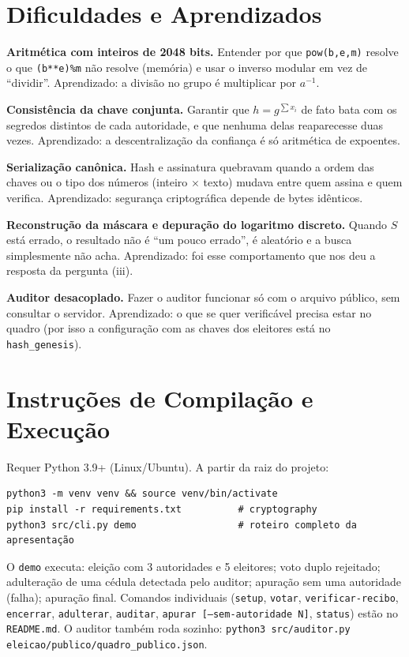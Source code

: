 \documentclass[11pt,a4paper]{article}
\begin{document}
\section{Dificuldades e Aprendizados}
\textbf{Aritmética com inteiros de 2048 bits.} Entender por que \texttt{pow(b,e,m)} resolve o que \texttt{(b**e)\%m} não resolve (memória) e usar o inverso modular em vez de ``dividir''. Aprendizado: a divisão no grupo é multiplicar por $a^{-1}$.

\textbf{Consistência da chave conjunta.} Garantir que $h=g^{\sum x_i}$ de fato bata com os segredos distintos de cada autoridade, e que nenhuma delas reaparecesse duas vezes. Aprendizado: a descentralização da confiança é só aritmética de expoentes.

\textbf{Serialização canônica.} Hash e assinatura quebravam quando a ordem das chaves ou o tipo dos números (inteiro $\times$ texto) mudava entre quem assina e quem verifica. Aprendizado: segurança criptográfica depende de bytes idênticos.

\textbf{Reconstrução da máscara e depuração do logaritmo discreto.} Quando $S$ está errado, o resultado não é ``um pouco errado'', é aleatório e a busca simplesmente não acha. Aprendizado: foi esse comportamento que nos deu a resposta da pergunta (iii).

\textbf{Auditor desacoplado.} Fazer o auditor funcionar só com o arquivo público, sem consultar o servidor. Aprendizado: o que se quer verificável precisa estar no quadro (por isso a configuração com as chaves dos eleitores está no \texttt{hash\_genesis}).

\section{Instruções de Compilação e Execução}
Requer Python 3.9+ (Linux/Ubuntu). A partir da raiz do projeto:
\begin{verbatim}
python3 -m venv venv && source venv/bin/activate
pip install -r requirements.txt          # cryptography
python3 src/cli.py demo                  # roteiro completo da apresentação
\end{verbatim}
O \texttt{demo} executa: eleição com 3 autoridades e 5 eleitores; voto duplo rejeitado; adulteração de uma cédula detectada pelo auditor; apuração sem uma autoridade (falha); apuração final. Comandos individuais (\texttt{setup}, \texttt{votar}, \texttt{verificar-recibo}, \texttt{encerrar}, \texttt{adulterar}, \texttt{auditar}, \texttt{apurar [--sem-autoridade N]}, \texttt{status}) estão no \texttt{README.md}. O auditor também roda sozinho: \texttt{python3 src/auditor.py eleicao/publico/quadro\_publico.json}.
\end{document}
